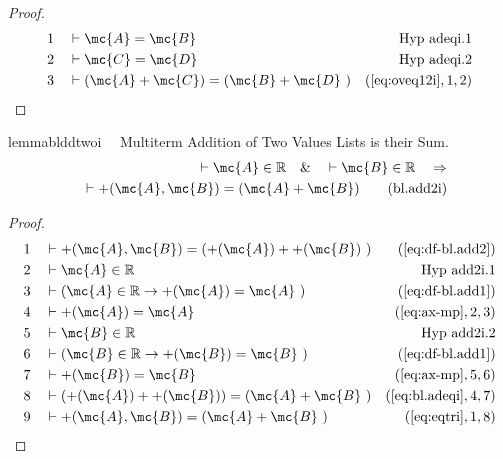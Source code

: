 \begin{proof}
\begin{align}
  1 &&  & \vdash \mc{A} = \mc{B}&\text{Hyp~adeqi.1}\notag%
  \\ 2 &&  & \vdash \mc{C} = \mc{D}&\text{Hyp~adeqi.2}\notag%
  \\ 3 &&  & \vdash ( \mc{A} + \mc{C} ) = ( \mc{B} + \mc{D}
     ~)&(\mbox{\ref{eq:oveq12i}},1,2)\notag
\end{align}
\end{proof}

\begin{restatable}{lemma}{blddtwoi}~~ Multiterm Addition of Two Values Lists is
their Sum.
\begin{align}
\vdash \mc{A} \in \mathbb{R}\quad\&\quad \vdash \mc{B} \in
    \mathbb{R}\quad\Rightarrow \notag \\ 
	\quad \vdash +( \mc{A} , \mc{B} ) = ( \mc{A} +
    \mc{B} )\label{eq:bl.add2i}\tag{bl.add2i}
\end{align}
\end{restatable}

\begin{proof}
\begin{align}
  1 &&  & \vdash +( \mc{A} , \mc{B} ) = ( +( \mc{A} ) + +( \mc{B} )
     ~)&(\mbox{\ref{eq:df-bl.add2}})\notag
  \\ 2 &&  & \vdash \mc{A} \in \mathbb{R}&\text{Hyp~add2i.1}\notag%
  \\ 3 &&  & \vdash ( \mc{A} \in \mathbb{R} \rightarrow +( \mc{A} ) = \mc{A}
     ~)&(\mbox{\ref{eq:df-bl.add1}})\notag
  \\ 4 &&  & \vdash +( \mc{A} ) = \mc{A}&(\mbox{\ref{eq:ax-mp}},2,3)\notag
  \\ 5 &&  & \vdash \mc{B} \in \mathbb{R}&\text{Hyp~add2i.2}\notag%
  \\ 6 &&  & \vdash ( \mc{B} \in \mathbb{R} \rightarrow +( \mc{B} ) = \mc{B}
     ~)&(\mbox{\ref{eq:df-bl.add1}})\notag
  \\ 7 &&  & \vdash +( \mc{B} ) = \mc{B}&(\mbox{\ref{eq:ax-mp}},5,6)\notag
  \\ 8 &&  & \vdash ( +( \mc{A} ) + +( \mc{B} ) ) = ( \mc{A} + \mc{B}
     ~)&(\mbox{\ref{eq:bl.adeqi}},4,7)\notag
  \\ 9 &&  & \vdash +( \mc{A} , \mc{B} ) = ( \mc{A} + \mc{B}
     ~)&(\mbox{\ref{eq:eqtri}},1,8)\notag
\end{align}
\end{proof}

